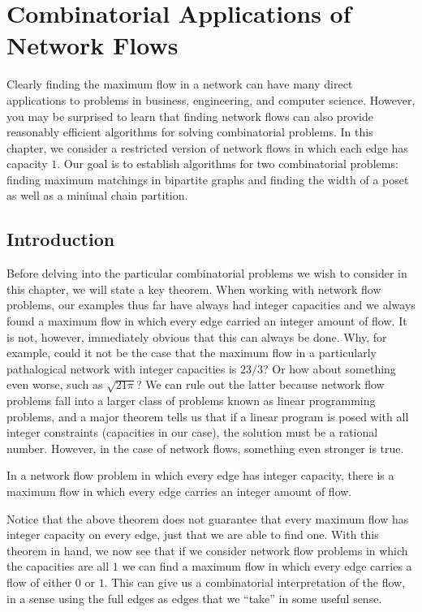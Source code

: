 
\chapter{Combinatorial Applications of Network
  Flows}\label{ch:flowapplications}

Clearly finding the maximum flow in a network can have many direct
applications to problems in business, engineering, and computer
science. However, you may be surprised to learn that finding network
flows can also provide reasonably efficient algorithms for solving
combinatorial problems. In this chapter, we consider a restricted
version of network flows in which each edge has capacity $1$. Our goal
is to establish algorithms for two combinatorial problems: finding
maximum matchings in bipartite graphs and finding the width of a poset
as well as a minimal chain partition.

\section{Introduction}\label{s:flowapplications:intro}

Before delving into the particular combinatorial problems we wish to
consider in this chapter, we will state a key theorem. When working
with network flow problems, our examples thus far have always had
integer capacities and we always found a maximum flow in which every
edge carried an integer amount of flow. It is not, however,
immediately obvious that this can always be done. Why, for example,
could it not be the case that the maximum flow in a particularly
pathalogical network with integer capacities is $23/3$? Or how about
something even worse, such as $\sqrt{21\pi}$?  We can rule out the
latter because network flow problems fall into a larger class of
problems known as linear programming problems, and a major theorem
tells us that if a linear program is posed with all integer
constraints (capacities in our case), the solution must be a rational
number. However, in the case of network flows, something even stronger
is true.
\begin{theorem}
  In a network flow problem in which every edge has integer capacity,
  there is a maximum flow in which every edge carries an integer
  amount of flow.
\end{theorem}

Notice that the above theorem does not guarantee that every maximum
flow has integer capacity on every edge, just that we are able to find
one. With this theorem in hand, we now see that if we consider
network flow problems in which the capacities are all $1$ we can find
a maximum flow in which every edge carries a flow of either $0$ or
$1$. This can give us a combinatorial interpretation of the flow, in a
sense using the full edges as edges that we ``take'' in some useful
sense.

